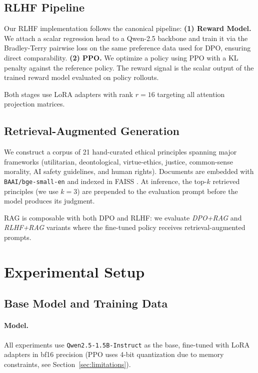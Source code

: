 \subsection{RLHF Pipeline}
Our RLHF implementation follows the canonical pipeline:
\textbf{(1) Reward Model.} We attach a scalar regression head to a Qwen-2.5 backbone and train it via the Bradley-Terry pairwise loss on the same preference data used for DPO, ensuring direct comparability.
\textbf{(2) PPO.} We optimize a policy using PPO \citep{schulman2017ppo} with a KL penalty against the reference policy. The reward signal is the scalar output of the trained reward model evaluated on policy rollouts.

Both stages use LoRA \citep{hu2021lora} adapters with rank $r=16$ targeting all attention projection matrices.

\subsection{Retrieval-Augmented Generation}
We construct a corpus of 21 hand-curated ethical principles spanning major frameworks (utilitarian, deontological, virtue-ethics, justice, common-sense morality, AI safety guidelines, and human rights). Documents are embedded with \texttt{BAAI/bge-small-en} \citep{xiao2024bge} and indexed in FAISS \citep{johnson2017faiss}. At inference, the top-$k$ retrieved principles (we use $k=3$) are prepended to the evaluation prompt before the model produces its judgment.

RAG is composable with both DPO and RLHF: we evaluate \emph{DPO+RAG} and \emph{RLHF+RAG} variants where the fine-tuned policy receives retrieval-augmented prompts.

\section{Experimental Setup}

\subsection{Base Model and Training Data}
\paragraph{Model.} All experiments use \texttt{Qwen2.5-1.5B-Instruct} \citep{qwen2024qwen2} as the base, fine-tuned with LoRA adapters in bf16 precision (PPO uses 4-bit quantization due to memory constraints, see Section~\ref{sec:limitations}).

